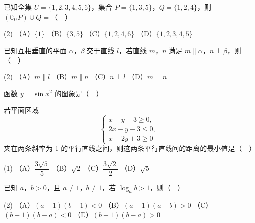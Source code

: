 \begin{question}
已知全集 \(U=\{1,2,3,4,5,6\}\)，集合 \(P=\{1,3,5\}\)，\(Q=\{1,2,4\}\)，则 \((\complement_U P)\cup Q=\)（　）

\begin{gkopts}(2)
\task （A）\(\{1\}\)
\task （B）\(\{3,5\}\)
\task （C）\(\{1,2,4,6\}\)
\task （D）\(\{1,2,3,4,5\}\)
\end{gkopts}

\end{question}
\begin{question}
已知互相垂直的平面 \(\alpha\)，\(\beta\) 交于直线 \(l\)，若直线 \(m\)，\(n\) 满足 \(m\parallel\alpha\)，\(n\perp\beta\)，则（　）

\begin{gkopts}(2)
\task （A）\(m\parallel l\)
\task （B）\(m\parallel n\)
\task （C）\(n\perp l\)
\task （D）\(m\perp n\)
\end{gkopts}

\Needspace{0.4\textheight}
\end{question}
\begin{question}
函数 \(y=\sin x^{2}\) 的图象是（　）
\nopagebreak[4]
\begin{center}\end{center}
\nopagebreak[4]
\end{question}
\begin{question}
若平面区域
\nopagebreak[4]
\[
\begin{cases}
x+y-3\geqslant 0,\\
2x-y-3\leqslant 0,\\
x-2y+3\geqslant 0
\end{cases}
\]
夹在两条斜率为 1 的平行直线之间，则这两条平行直线间的距离的最小值是（　）

\begin{gkopts}(1)
\task （A）\(\dfrac{3\sqrt{5}}{5}\)
\task （B）\(\sqrt{2}\)
\task （C）\(\dfrac{3\sqrt{2}}{2}\)
\task （D）\(\sqrt{5}\)
\end{gkopts}

\end{question}
\begin{question}
已知 \(a\)，\(b>0\)，且 \(a\neq1\)，\(b\neq1\)，若 \(\log_a b>1\)，则（　）

\begin{gkopts}(2)
\task （A）\((a-1)(b-1)<0\)
\task （B）\((a-1)(a-b)>0\)
\task （C）\((b-1)(b-a)<0\)
\task （D）\((b-1)(b-a)>0\)
\end{gkopts}

\end{question}

